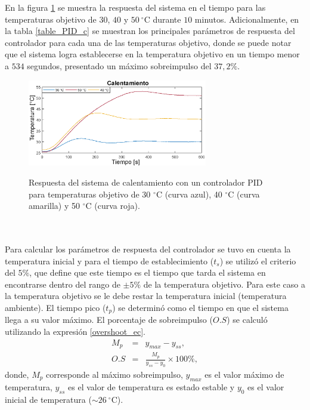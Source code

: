 En la figura \ref{fig:Respuesta_PID_c} se muestra la respuesta del sistema en el tiempo para las temperaturas objetivo de $30$, $40$ \mbox{y} $50~^\circ \mbox{C}$ durante $10$ minutos. Adicionalmente, en la tabla \ref{table_PID_c} se muestran los principales parámetros de respuesta del controlador para cada una de las temperaturas objetivo, donde se puede notar que el sistema logra establecerse en la temperatura objetivo en un tiempo menor a $534$ segundos, presentado un máximo sobreimpulso del $37,2\%$.
\begin{figure}[h!]
\begin{centering}
    \caption{Respuesta del sistema de calentamiento con un controlador PID para temperaturas objetivo de 30 $^\circ $C (curva azul), 40 $^\circ $C (curva amarilla) y 50 $^\circ $C (curva roja).}
    \includegraphics[width=0.7\textwidth]{Images/PID_calentamiento.eps}
    \label{fig:Respuesta_PID_c}
  \par\end{centering}
\end{figure}
\\ \\
Para calcular los parámetros de respuesta del controlador se tuvo en cuenta la temperatura inicial y para el tiempo de establecimiento ($t_s$) se utilizó el criterio del $5\%$, que define que este tiempo es el tiempo que tarda el sistema en encontrarse dentro del rango de  $\pm5\%$ de la temperatura objetivo. Para este caso a la temperatura objetivo se le debe restar la temperatura inicial (temperatura ambiente). El tiempo pico ($t_p$) se determinó como el tiempo en que el sistema llega a su valor máximo. El porcentaje de sobreimpulso ($O.S$) se calculó utilizando la expresión \ref{overshoot_ec}.\\ 
\begin{eqnarray}
    M_p&=& y_{max} - y_{ss},\\
    O.S&=&\frac{M_p}{y_{ss}-y_0}\times100\%,
    \label{overshoot_ec}
\end{eqnarray}
donde, $M_p$ corresponde al máximo sobreimpulso, $y_{max}$ es el valor máximo de temperatura, $y_{ss}$ es el valor de temperatura es estado estable y $y_0$ es el valor inicial de temperatura ($\sim26~^\circ \mbox{C}$).
